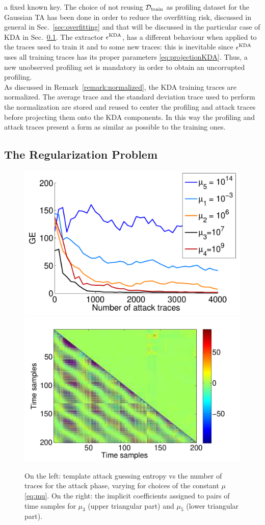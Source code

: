 a fixed known key. The choice of not reusing $\mathcal{D}_{\text{train}}$ as profiling dataset for the Gaussian TA has been done in order to reduce the overfitting risk, discussed in general in Sec.~\ref{sec:overfitting} and that will be discussed in the particular case of KDA in Sec.~\ref{sec:mu}. The extractor $\epsilon^{\mathrm{KDA}}$, has a different behaviour when applied to the traces used to train it and to some new traces: this is inevitable since $\epsilon^{\mathrm{KDA}}$ uses all training traces has its proper parameters \eqref{eq:projectionKDA}. Thus, a new unobserved profiling set is mandatory in order to obtain an uncorrupted profiling.
\\

As discussed in Remark~\ref{remark:normalized}, the KDA training traces are normalized. The average trace and the standard deviation trace used to perform the normalization are stored and reused to center the profiling and attack traces before projecting them onto the KDA components. In this way the profiling and attack traces present a form as similar as possible to the training ones.

\subsection{The Regularization Problem}\label{sec:mu}


\begin{figure}
\includegraphics[width=.5\textwidth]{../Figures/CARDIS2016/mu_comparison_new.pdf} 
\includegraphics[width=.5\textwidth]{../Figures/CARDIS2016/good_bad_coeffs.pdf} 
\caption[Dependence of KDA performances on the regularization parameter $\mu$. Implicit coefficients.]{On the left: template attack guessing entropy vs the number of traces for the attack phase, varying for choices of the constant $\mu$  \eqref{eq:mu}. On the right: the implicit coefficients assigned to pairs of time samples for $\mu_3$ (upper triangular part) and $\mu_5$ (lower triangular part). }\label{fig:mu}
\end{figure}


